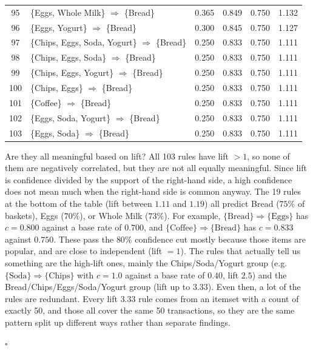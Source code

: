 \documentclass[12pt,letterpaper, onecolumn]{exam}
\begin{document}
\begin{questions}
\begin{solution}
{\begin{longtable}{|c|l|c|c|c|c|}
            95 & \{Eggs, Whole Milk\} $\Rightarrow$ \{Bread\} & 0.365 & 0.849 & 0.750 & 1.132 \\
            96 & \{Eggs, Yogurt\} $\Rightarrow$ \{Bread\} & 0.300 & 0.845 & 0.750 & 1.127 \\
            97 & \{Chips, Eggs, Soda, Yogurt\} $\Rightarrow$ \{Bread\} & 0.250 & 0.833 & 0.750 & 1.111 \\
            98 & \{Chips, Eggs, Soda\} $\Rightarrow$ \{Bread\} & 0.250 & 0.833 & 0.750 & 1.111 \\
            99 & \{Chips, Eggs, Yogurt\} $\Rightarrow$ \{Bread\} & 0.250 & 0.833 & 0.750 & 1.111 \\
            100 & \{Chips, Eggs\} $\Rightarrow$ \{Bread\} & 0.250 & 0.833 & 0.750 & 1.111 \\
            101 & \{Coffee\} $\Rightarrow$ \{Bread\} & 0.250 & 0.833 & 0.750 & 1.111 \\
            102 & \{Eggs, Soda, Yogurt\} $\Rightarrow$ \{Bread\} & 0.250 & 0.833 & 0.750 & 1.111 \\
            103 & \{Eggs, Soda\} $\Rightarrow$ \{Bread\} & 0.250 & 0.833 & 0.750 & 1.111 \\
        \end{longtable}
        }

        Are they all meaningful based on lift? All 103 rules have lift $>1$, so none of them are negatively correlated, but they are not all equally meaningful. Since lift is confidence divided by the support of the right-hand side, a high confidence does not mean much when the right-hand side is common anyway. The 19 rules at the bottom of the table (lift between $1.11$ and $1.19$) all predict Bread ($75\%$ of baskets), Eggs ($70\%$), or Whole Milk ($73\%$). For example, $\{\text{Bread}\}\Rightarrow\{\text{Eggs}\}$ has $c=0.800$ against a base rate of $0.700$, and $\{\text{Coffee}\}\Rightarrow\{\text{Bread}\}$ has $c=0.833$ against $0.750$. These pass the $80\%$ confidence cut mostly because those items are popular, and are close to independent (lift $=1$). The rules that actually tell us something are the high-lift ones, mainly the Chips/Soda/Yogurt group (e.g. $\{\text{Soda}\}\Rightarrow\{\text{Chips}\}$ with $c=1.0$ against a base rate of $0.40$, lift $2.5$) and the Bread/Chips/Eggs/Soda/Yogurt group (lift up to $3.33$). Even then, a lot of the rules are redundant. Every lift $3.33$ rule comes from an itemset with a count of exactly 50, and those all cover the same 50 transactions, so they are the same pattern split up different ways rather than separate findings.

        $\square$
    \end{solution}

\end{questions}
\end{document}
